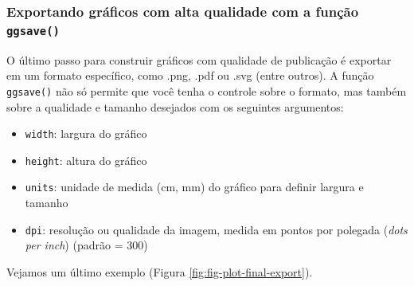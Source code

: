 \documentclass[
]{article}
\providecommand{\tightlist}{%
  \setlength{\itemsep}{0pt}\setlength{\parskip}{0pt}}
\begin{document}
\hypertarget{exportando-gruxe1ficos-com-alta-qualidade-com-a-funuxe7uxe3o-ggsave}{%
\subsubsection{\texorpdfstring{Exportando gráficos com alta qualidade com a função \texttt{ggsave()}}{Exportando gráficos com alta qualidade com a função ggsave()}}\label{exportando-gruxe1ficos-com-alta-qualidade-com-a-funuxe7uxe3o-ggsave}}

O último passo para construir gráficos com qualidade de publicação é exportar em um formato específico, como .png, .pdf ou .svg (entre outros). A função \texttt{ggsave()} não só permite que você tenha o controle sobre o formato, mas também sobre a qualidade e tamanho desejados com os seguintes argumentos:

\begin{itemize}
\tightlist
\item
  \texttt{width}: largura do gráfico
\item
  \texttt{height}: altura do gráfico
\item
  \texttt{units}: unidade de medida (cm, mm) do gráfico para definir largura e tamanho
\item
  \texttt{dpi}: resolução ou qualidade da imagem, medida em pontos por polegada (\emph{dots per inch}) (padrão = 300)
\end{itemize}

Vejamos um último exemplo (Figura \ref{fig:fig-plot-final-export}).
\end{document}
